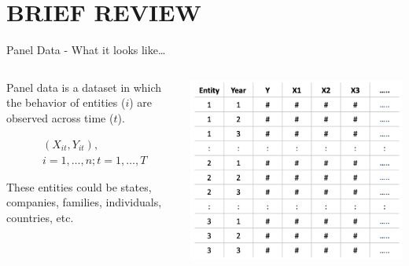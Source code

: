 \documentclass[
  10pt,
  ignorenonframetext,
]{beamer}
\begin{document}
\hypertarget{brief-review}{%
\section{BRIEF REVIEW}\label{brief-review}}

\begin{frame}{Panel Data - What it looks like\ldots{}}
\protect\hypertarget{panel-data---what-it-looks-like}{}
\begin{columns}[T]
\begin{column}{.3\textwidth}
\vspace{7mm}

\small

Panel data is a dataset in which the behavior of entities (\(i\)) are
observed across time (\(t\)).

\vspace{2mm}

\[
\begin{aligned}
&(X_{it},Y_{it}), \\
&i = 1,\ldots,n; t = 1,\ldots, T
\end{aligned}
\]

\vspace{2mm}

These entities could be states, companies, families, individuals,
countries, etc.
\end{column}

\begin{column}{0.48\textwidth}
\begin{flushright}\includegraphics[width=1.2\linewidth]{pictures/PanelData_longform} \end{flushright}
\end{column}
\end{columns}
\end{frame}
\end{document}
